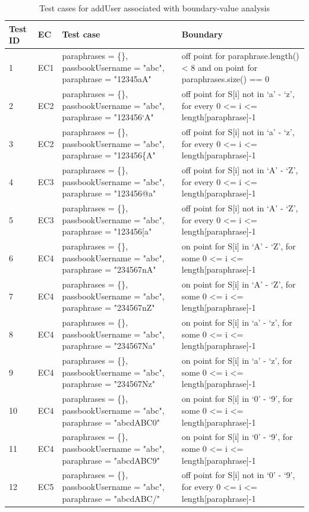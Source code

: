 \documentclass{article}
\begin{document}
\begin{longtable}{|p{0.5cm}|p{0.5cm}|p{7cm}|p{5cm}|}
\caption{Test cases for addUser associated with boundary-value analysis}\\
\hline 
Test ID&EC&Test case&Boundary\\
\hline  
1&EC1&paraphrases = \{\}, passbookUsername = "abc", paraphrase = "12345aA"&off point for paraphrase.length() < 8 and on point for paraphrases.size() == 0\\
\hline
2&EC2&paraphrases = \{\}, passbookUsername = "abc", paraphrase = "123456`A"&off point for S[i] not in ‘a’ - ‘z’, for every 0 <= i <= length[paraphrase]-1\\
\hline
3&EC2&paraphrases = \{\}, passbookUsername = "abc", paraphrase = "123456\{A"&off point for S[i] not  in ‘a’ - ‘z’, for every 0 <= i <= length[paraphrase]-1\\
\hline
4&EC3&paraphrases = \{\}, passbookUsername = "abc", paraphrase = "123456@a"&off point for S[i] not in ‘A’ - ‘Z’, for every 0 <= i <= length[paraphrase]-1\\
\hline
5&EC3&paraphrases = \{\}, passbookUsername = "abc", paraphrase = "123456[a"&off point for S[i] not  in ‘A’ - ‘Z’, for every 0 <= i <= length[paraphrase]-1\\
\hline
6&EC4&paraphrases = \{\}, passbookUsername = "abc", paraphrase = "234567nA"&on point for S[i] in ‘A’ - ‘Z’, for some 0 <= i <= length[paraphrase]-1\\
\hline
7&EC4&paraphrases = \{\}, passbookUsername = "abc", paraphrase = "234567nZ"&on point for S[i] in ‘A’ - ‘Z’, for some 0 <= i <= length[paraphrase]-1\\
\hline
8&EC4&paraphrases = \{\}, passbookUsername = "abc", paraphrase = "234567Na"&on point for S[i] in ‘a’ - ‘z’, for some 0 <= i <= length[paraphrase]-1\\
\hline
9&EC4&paraphrases = \{\}, passbookUsername = "abc", paraphrase = "234567Nz"&on point for S[i] in ‘a’ - ‘z’, for some 0 <= i <= length[paraphrase]-1\\
\hline
10&EC4&paraphrases = \{\}, passbookUsername = "abc", paraphrase = "abcdABC0"&on point for S[i] in ‘0’ - ‘9’, for some 0 <= i <= length[paraphrase]-1\\
\hline
11&EC4&paraphrases = \{\}, passbookUsername = "abc", paraphrase = "abcdABC9"&on point for S[i] in ‘0’ - ‘9’, for some 0 <= i <= length[paraphrase]-1\\
\hline
12&EC5&paraphrases = \{\}, passbookUsername = "abc", paraphrase = "abcdABC/"&off point for S[i] not in ‘0’ - ‘9’, for every 0 <= i <= length[paraphrase]-1\\

\end{longtable}
\end{document}
